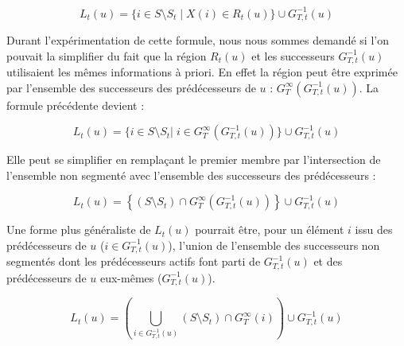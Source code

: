 	\begin{equation}
		L_t(u) = \{i \in S \setminus S_t \;|\; X(i) \in R_t(u)\} \cup G_{T,t}^{-1}(u)
		\label{eq:nb_lobe}
	\end{equation}

	Durant l'expérimentation de cette formule, nous nous sommes demandé si l'on pouvait la simplifier du fait que la région $R_t(u)$ et les successeurs $G_{T,t}^{-1}(u)$ utilisaient les mêmes informations à priori. En effet la région peut être exprimée par l'ensemble des successeurs des prédécesseurs de $u$ : $G_T^{\infty}(G_{T,t}^{-1}(u))$.	La formule précédente devient :

	\begin{equation}
	L_t(u) =  \{ i\in S \setminus S_t|\; i \in G_T^{\infty}(G_{T,t}^{-1}(u))\} \cup G_{T,t}^{-1}(u)
	\end{equation}

	Elle peut se simplifier en remplaçant le premier membre par l'intersection de l'ensemble non segmenté avec l'ensemble des successeurs des prédécesseurs : 


	\begin{equation}
		L_t(u) = \left\{ ( S \setminus S_t ) \cap  G_T^{\infty}(G_{T,t}^{-1}(u)) \right\} \cup G_{T,t}^{-1}(u)
	\end{equation}

	Une forme plus généraliste de $L_t(u)$ pourrait être, pour un élément $i$ issu des prédécesseurs de $u$ ($i\in G_{T,t}^{-1}(u)$), l'union de l'ensemble des successeurs non segmentés dont les prédécesseurs actifs font parti de $G_{T,t}^{-1}(u)$ et des prédécesseurs de $u$ eux-mêmes ($G_{T,t}^{-1}(u)$). 

	\begin{equation}
		L_t(u) =  \left(\bigcup_{i\in G_{T,t}^{-1}(u)} ( S \setminus S_t ) \cap G_T^{\infty}(i) \right) \cup G_{T,t}^{-1}(u) 
	\end{equation}

